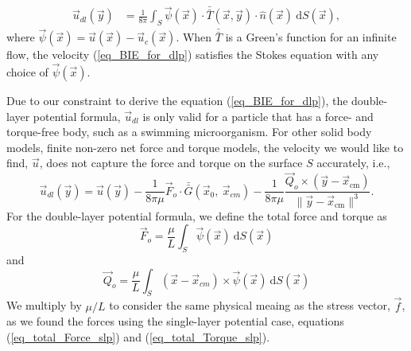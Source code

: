\begin{align}
   \vec{u}_{dl}(\vec{y}) & =
	\frac{1}{8 \pi } \int_S  
	\vec{\psi}(\vec{x})
	\cdot  \bar{\bar{T}}(\vec{x},\vec{y})  
	\cdot \hat{n} ( \vec{x})
	\ \text{d}S(\vec{x}),
\label{eq_BIE_for_dlp}
\end{align}
where $
	\vec{\psi}(\vec{x}) =    \vec{u}(\vec{x})  - \vec{u}_c (\vec{x})$.
When $\bar{\bar{T }}$ is a Green's function for an infinite flow, the velocity (\ref{eq_BIE_for_dlp}) satisfies the Stokes equation with any choice of $\vec{\psi}(\vec{x}) $.
\par
%
Due to our constraint to derive the equation (\ref{eq_BIE_for_dlp}), the double-layer potential formula, $\vec{u}_{dl}$ is only valid for a particle that has a force- and torque-free body, such as a swimming microorganism.
For other solid body models, finite non-zero net force and torque models, the velocity we would like to find, $\vec{u}$, does not capture the force and torque on the surface $S$ accurately, i.e., 
\begin{equation}
\vec{u}_{dl}(\vec{y}) = \vec{u}(\vec{y}) 
- \frac{1}{8 \pi \mu }\vec{F}_o \cdot \bar{\bar{G}}(\vec{x}_{0}, \ \vec{x}_{cm})
- \frac{1}{8 \pi \mu } \frac{\vec{Q}_o \times  (\vec{y}   - \vec{x}_{\text{cm}} ) }{\| \vec{y}   - \vec{x}_{\text{cm}} \|^3 }.
\label{eq_v_dlp}
\end{equation}
For the double-layer potential formula, we define the total force and torque as
\begin{equation}
 \vec{F}_o
  = \frac{\mu}{L} \int_S \vec{\psi}(\vec{x}) \  \text{d}S(\vec{x})
 \label{eq_total_Force_dlp}
 \end{equation} 
 and
 \begin{equation}
 \vec{Q}_o 
 = \frac{\mu}{L} \int_S (\vec{x} - \vec{x}_{cm}) \times \vec{\psi}(\vec{x})  \ \text{d}S(\vec{x})
 \label{eq_total_Torque_dlp}
 \end{equation}
%
We multiply by $\mu / L$ to consider the same physical meaing as the stress vector, $\vec{f}$, as we found the forces using the single-layer potential case, equations (\ref{eq_total_Force_slp}) and (\ref{eq_total_Torque_slp}).
